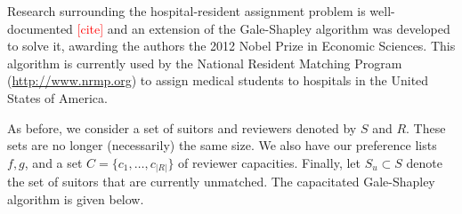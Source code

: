 Research surrounding the hospital-resident assignment problem is well-documented 
\textcolor{red}{[cite]} and an extension of the Gale-Shapley algorithm was
developed to solve it, awarding the authors the 2012 Nobel Prize in Economic
Sciences. This algorithm is currently used by the National Resident Matching
Program (\url{http://www.nrmp.org}) to assign medical students to hospitals in
the United States of America.

As before, we consider a set of suitors and reviewers denoted by \(S\) and 
\(R\). These sets are no longer (necessarily) the same size. We also have our 
preference lists \(f, g\), and a set \(C = \{c_1, \ldots, c_{|R|}\}\) of 
reviewer capacities. Finally, let \(S_u \subset S\) denote the set of suitors 
that are currently unmatched. The capacitated Gale-Shapley algorithm is given 
below.


